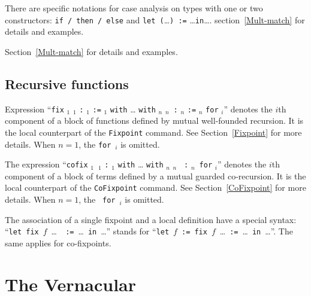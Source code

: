 There are specific notations for case analysis on types with one or
two constructors: {\tt if / then / else} and
{\tt let (}\ldots{\tt ) :=} \ldots {\tt in}\ldots. \SeeAlso
section~\ref{Mult-match} for details and examples.

\SeeAlso Section~\ref{Mult-match} for details and examples.

\subsection{Recursive functions
\label{fixpoints}
}

Expression ``{\tt fix} \ident$_1$ \binder$_1$ {\tt :} {\type$_1$}
\texttt{:=} \term$_1$ {\tt with} {\ldots} {\tt with} \ident$_n$
\binder$_n$~{\tt :} {\type$_n$} \texttt{:=} \term$_n$ {\tt for}
{\ident$_i$}'' denotes the $i$th component of a block of functions
defined by mutual well-founded recursion. It is the local counterpart
of the {\tt Fixpoint} command. See Section~\ref{Fixpoint} for more
details. When $n=1$, the {\tt for}~{\ident$_i$} is omitted.

The expression ``{\tt cofix} \ident$_1$~\binder$_1$ {\tt :}
{\type$_1$} {\tt with} {\ldots} {\tt with} \ident$_n$ \binder$_n$ {\tt
:} {\type$_n$}~{\tt for} {\ident$_i$}'' denotes the $i$th component of
a block of terms defined by a mutual guarded co-recursion. It is the
local counterpart of the {\tt CoFixpoint} command. See
Section~\ref{CoFixpoint} for more details. When $n=1$, the {\tt
for}~{\ident$_i$} is omitted.

The association of a single fixpoint and a local
definition have a special syntax: ``{\tt let fix}~$f$~{\ldots}~{\tt
  :=}~{\ldots}~{\tt in}~{\ldots}'' stands for ``{\tt let}~$f$~{\tt :=
  fix}~$f$~\ldots~{\tt :=}~{\ldots}~{\tt in}~{\ldots}''. The same
  applies for co-fixpoints.


\section{The Vernacular
\label{Vernacular}}

